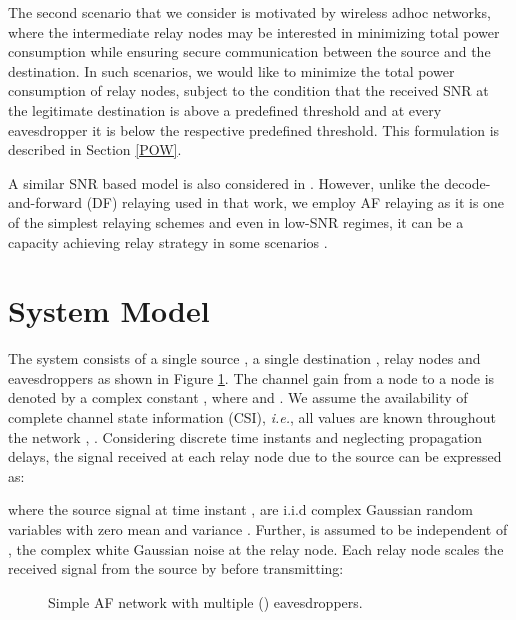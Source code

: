 \documentclass[journal,,draftclsnofoot letterpaper, onecolumn]{IEEEtran}
\begin{document}
The second scenario that we consider is motivated by wireless adhoc networks, where the intermediate relay nodes may be interested in minimizing total power consumption while ensuring secure communication between the source and the destination.
In such scenarios, we would like to minimize the total power consumption of relay nodes, subject to the condition that the received SNR at the legitimate destination is above a predefined threshold and at every eavesdropper it is below the respective predefined threshold.
This formulation is described in Section \ref{POW}. 

A similar SNR based model is also considered in \cite{sarma}. However, unlike the decode-and-forward (DF) relaying used in that work, we employ AF relaying as it is one of the simplest relaying schemes and even in low-SNR regimes, it can be a capacity achieving relay strategy in some scenarios \cite{107gomadamJafar}.



\section{System Model}
\label{sec:model}
The system consists of a single source , a single destination ,  relay nodes  and  eavesdroppers  as shown in Figure \ref{fig:model}. The channel gain from a node  to a node  is denoted by a complex constant , where  and . We assume the availability of complete channel state information 
(CSI), \textit{i.e.}, all  values are known throughout the network \cite{dong}, \cite{sarma}. Considering  discrete time instants and neglecting propagation delays, the signal received at each relay node due to the source can be expressed as:
 
where the source signal  at time instant , are i.i.d complex Gaussian random variables with zero mean and variance . 
Further,  is assumed to be independent of , the complex white Gaussian noise  at the  relay node. Each relay node  scales the received signal from the source by  before transmitting: \begin{figure}[!t]
\centering
{}
\caption{Simple AF network with multiple () eavesdroppers.}
\label{fig:model}
\end{figure}
\end{document}
